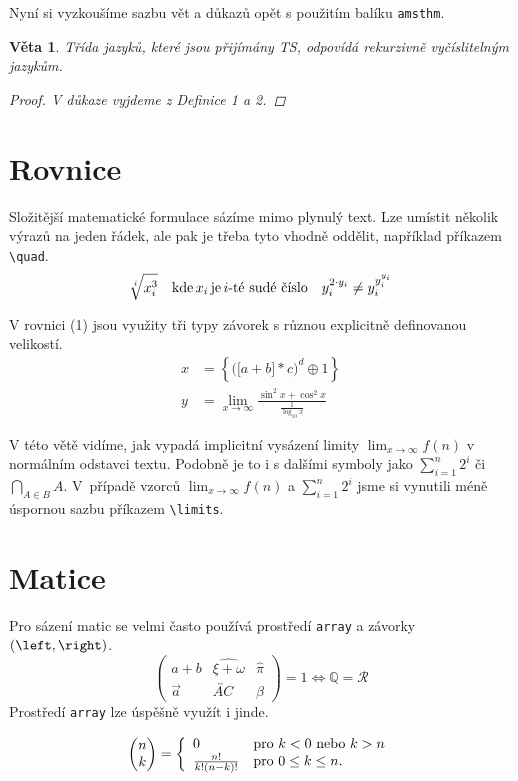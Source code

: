 \documentclass[a4paper, 11pt]{article}
\newtheorem{veta}{Věta}
\begin{document}
Nyní si vyzkoušíme sazbu vět a důkazů opět s použitím
balíku \verb|amsthm|.
\begin{veta}
Třída jazyků, které jsou přijímány TS, odpovídá \textnormal{rekurzivně vyčíslitelným jazykům.}


\begin{proof}
V důkaze vyjdeme z Definice 1 a 2.
\end{proof}
\end{veta}
\section{Rovnice}
Složitější matematické formulace sázíme mimo plynulý text. Lze umístit několik výrazů na jeden řádek, ale pak je třeba tyto vhodně oddělit, například příkazem \verb|\quad|.
$$
    \sqrt[i]{x_i^3} \quad \textnormal{kde}\,
     x_i \, \textnormal{je}\,i\textnormal{-té sudé číslo} \quad y_i^{2\cdot y_i} \neq y_i^{y_i^{y_i}} 
$$

V rovnici (1) jsou využity tři typy závorek s různou
explicitně definovanou velikostí.
\begin{align}
    x &= \left\{ \Big(\big[a + b\big] * c\Big)^d \oplus 1 \right\} \\
    y &= \lim_{x \to \infty} \frac{\sin^2x+\cos^2x}{\frac{1}{\log_{10} x}}
\end{align}

V této větě vidíme, jak vypadá implicitní vysázení limity $\lim_{x \to \infty} f(n)$ v normálním odstavci textu. Podobně je to i s dalšími symboly jako $\sum_{i=1}^{n} 2^{i}$ či $\bigcap_{A\in B} A$. V~případě vzorců $\displaystyle\lim_{x \to \infty} f(n) $ a $\sum\limits_{i=1}^{n} 2^{i}$
jsme si vynutili méně úspornou sazbu příkazem \verb|\limits|.

\section{Matice}
Pro sázení matic se velmi často používá prostředí \verb|array| a závorky $\left(\verb|\left|, \verb|\right|\right)$.
$$
\begin{pmatrix}
a+b&\widehat{\xi+\omega}&\hat{\pi}\\
\vec{a}&\overleftrightarrow{AC}&\beta
\end{pmatrix}
= 1 \Longleftrightarrow \mathbb{Q} = \mathcal{R}
$$
Prostředí \verb|array| lze úspěšně využít i jinde.

$$
\begin{pmatrix}
n\\
k
\end{pmatrix}
=\left\{ \begin{array}{ll}
         0 & \mbox{pro $k < 0$ nebo $ k > n$}\\
        \frac{n!}{k!\left(n-k\right)!} & \mbox{pro $0 \leq k \leq n$}.\end{array} \right.
$$
\end{document}
